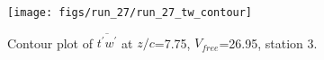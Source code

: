 \begin{figure}[H]
\centering
\texttt{[image: figs/run\_27/run\_27\_tw\_contour]}
\caption{Contour plot of $\overline{t^\prime w^\prime}$ at $z/c$=7.75, $V_{free}$=26.95, station 3.}
\label{fig:run_27_tw_contour}
\end{figure}


